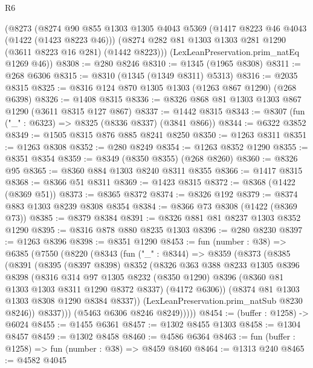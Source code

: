 \begin{lexlean}{R6}
\begin{coremodule}
    (@8273
      (@8274
        @90
        @855
        @1303
        @1305
        @4043
        @5369
        (@1417 @8223 @46 @4043 (@1422 (@1423 @8223 @46)))
        (@8274 @282 @81 @1303 @1303 @281 @1290 (@3611 @8223 @16 @281) (@1442 @8223)))
      (LexLeanPreservation.prim_natEq @1269 @46))
@8308 := @280 @8246
@8310 := @1345 (@1965 @8308)
@8311 := @268 @6306
@8315 := @8310 (@1345 (@1349 @8311) @5313)
@8316 := @2035 @8315
@8325 := @8316 @124 @870 @1305 @1303 (@1263 @867 @1290) (@268 @6398)
@8326 := @1408 @8315
@8336 := @8326 @868 @81 @1303 @1303 @867 @1290 (@3611 @8315 @127 @867)
@8337 := @1442 @8315
@8343 := @8307 (fun ("_" : @6323) => @8325 (@8336 @8337) (@3841 @866))
@8344 := @6322 @3852
@8349 := @1505 @8315 @876 @885 @8241 @8250
@8350 := @1263 @8311
@8351 := @1263 @8308
@8352 := @280 @8249
@8354 := @1263 @8352 @1290
@8355 := @8351 @8354
@8359 := @8349 (@8350 @8355) (@268 @8260)
@8360 := @8326 @95
@8365 := @8360 @884 @1303 @8240 @8311 @8355
@8366 := @1417 @8315
@8368 := @8366 @51 @8311
@8369 := @1423 @8315
@8372 := @8368 (@1422 (@8369 @51))
@8373 := @8365 @8372
@8374 := @8326 @192
@8379 := @8374 @883 @1303 @8239 @8308 @8354
@8384 := @8366 @73 @8308 (@1422 (@8369 @73))
@8385 := @8379 @8384
@8391 := @8326 @881 @81 @8237 @1303 @8352 @1290
@8395 := @8316 @878 @880 @8235 @1303
@8396 := @280 @8230
@8397 := @1263 @8396
@8398 := @8351 @1290
@8453 := fun (number : @38) =>
  @6385
    (@7550
      (@8220
        (@8343
          (fun ("_" : @8344) =>
          @8359
            (@8373
              (@8385
                (@8391
                  (@8395
                    (@8397 @8398)
                    @8352
                    (@8326
                      @363
                      @388
                      @8233
                      @1305
                      @8396
                      @8398
                      (@8316
                        @314
                        @97
                        @1305
                        @8232
                        (@8350 @1290)
                        @8396
                        (@8360 @81 @1303 @1303 @8311 @1290 @8372 @8337)
                        (@4172 @6306))
                      (@8374 @81 @1303 @1303 @8308 @1290 @8384 @8337))
                    (LexLeanPreservation.prim_natSub @8230 @8246))
                  @8337)))
            (@5463 @6306 @8246 @8249)))))
@8454 := (buffer : @1258) -> @6024
@8455 := @1455 @6361
@8457 := @1302 @8455 @1303
@8458 := @1304 @8457
@8459 := @1302 @8458
@8460 := @4586 @6364
@8463 := fun (buffer : @1258) => fun (number : @38) => @8459 @8460
@8464 := @1313 @240
@8465 := @4582 @4045

\end{coremodule}
\end{lexlean}
